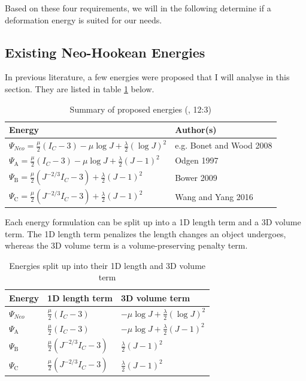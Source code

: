 Based on these four requirements, we will in the following determine if a deformation energy is suited for our needs.


\subsection{Existing Neo-Hookean Energies}

In previous literature, a few energies were proposed that I will analyse in this section. They are listed in table \ref{table:energies} below.

\begin{table}[!htbp]
\centering
    \begin{tabular}{ | l | l |}
    \hline
    \textbf{Energy} & \textbf{Author(s)} \\ \hline
    $\Psi_{Neo}=\frac{\mu}{2}\left(I_{C}-3\right)-\mu \log J+\frac{\lambda}{2}(\log J)^{2}$ & e.g. Bonet and Wood 2008 \\ \hline
    $\Psi_{\mathrm{A}}=\frac{\mu}{2}\left(I_{C}-3\right)-\mu \log J+\frac{\lambda}{2}(J-1)^{2}$ & Odgen 1997 \\ \hline
    $\Psi_{\mathrm{B}}=\frac{\mu}{2}\left(J^{-2 / 3} I_{C}-3\right)+\frac{\lambda}{2}(J-1)^{2}$ & Bower 2009 \\ \hline
    $\Psi_{\mathrm{C}}=\frac{\mu}{2}\left(J^{-2 / 3} I_{C}-3\right)+\frac{\lambda}{2}(J-1)^{2}$ & Wang and Yang 2016 \\ \hline
    \end{tabular}
    \caption[Summary of proposed energies]{Summary of proposed energies (\cite{Smith:2018:SNF:3191713.3180491}, 12:3)}
\label{table:energies}
\end{table}

Each energy formulation can be split up into a 1D length term and a 3D volume term. The 1D length term penalizes the length changes an object undergoes, whereas the 3D volume term is a volume-preserving penalty term.

\begin{table}[!htbp]
\centering
    \begin{tabular}{ | l | l | l |}
    \hline
    \textbf{Energy} & \textbf{1D length term} & \textbf{3D volume term} \\ \hline
    $\Psi_{Neo}$ & $\frac{\mu}{2}\left(I_{C}-3\right)$ & $-\mu \log J+\frac{\lambda}{2}(\log J)^{2}$ \\ \hline
    $\Psi_{\mathrm{A}}$ & $\frac{\mu}{2}\left(I_{C}-3\right)$ & $-\mu \log J+\frac{\lambda}{2}(J-1)^{2}$ \\ \hline
    $\Psi_{\mathrm{B}}$ & $\frac{\mu}{2}\left(J^{-2 / 3} I_{C}-3\right)$ & $\frac{\lambda}{2}(J-1)^{2}$ \\ \hline
    $\Psi_{\mathrm{C}}$ & $\frac{\mu}{2}\left(J^{-2 / 3} I_{C}-3\right)$ & $\frac{\lambda}{2}(J-1)^{2}$ \\ \hline
    \end{tabular}
    \caption{Energies split up into their 1D length and 3D volume term}
\label{table:energies_split}
\end{table}

